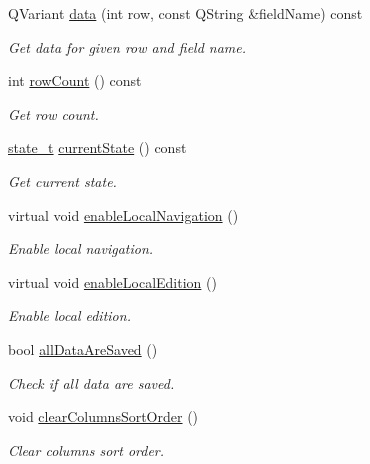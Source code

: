 \begin{DoxyCompactItemize}
Q\-Variant \hyperlink{classmdt_abstract_sql_widget_a3d362ebfc2d4f4b40b48ca08db287b3c}{data} (int row, const Q\-String \&field\-Name) const 
\begin{DoxyCompactList}\small\item\em Get data for given row and field name. \end{DoxyCompactList}\item 
int \hyperlink{classmdt_abstract_sql_widget_a5e25e4a2e0dc56c06c530c9b543366f2}{row\-Count} () const 
\begin{DoxyCompactList}\small\item\em Get row count. \end{DoxyCompactList}\item 
\hyperlink{classmdt_abstract_sql_widget_a54e6a7f2b41fb3edfa1e4ed62abf4072}{state\-\_\-t} \hyperlink{classmdt_abstract_sql_widget_a786eb7b7b111eef748002419984be7d9}{current\-State} () const 
\begin{DoxyCompactList}\small\item\em Get current state. \end{DoxyCompactList}\item 
virtual void \hyperlink{classmdt_abstract_sql_widget_a586e89097e9b4c27888695796ce945a0}{enable\-Local\-Navigation} ()
\begin{DoxyCompactList}\small\item\em Enable local navigation. \end{DoxyCompactList}\item 
virtual void \hyperlink{classmdt_abstract_sql_widget_a4ad94a530c77292d122d38eb041da6e9}{enable\-Local\-Edition} ()
\begin{DoxyCompactList}\small\item\em Enable local edition. \end{DoxyCompactList}\item 
bool \hyperlink{classmdt_abstract_sql_widget_aa5824c5fc3b0a7e118dd9ebb19084d2c}{all\-Data\-Are\-Saved} ()
\begin{DoxyCompactList}\small\item\em Check if all data are saved. \end{DoxyCompactList}\item 
void \hyperlink{classmdt_abstract_sql_widget_abe9677dd1d70d5e67349f6fa6d2216ae}{clear\-Columns\-Sort\-Order} ()
\begin{DoxyCompactList}\small\item\em Clear columns sort order. \end{DoxyCompactList}\item 

\end{DoxyCompactItemize}
